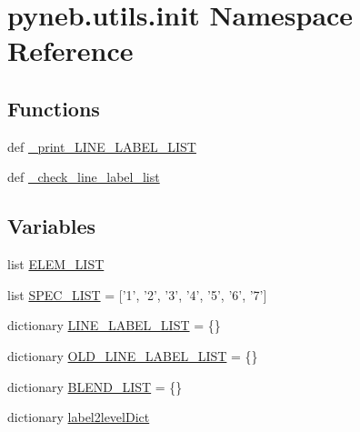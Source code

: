 \hypertarget{namespacepyneb_1_1utils_1_1init}{\section{pyneb.\-utils.\-init Namespace Reference}
\label{namespacepyneb_1_1utils_1_1init}
}
\subsection*{Functions}
\begin{DoxyCompactItemize}
\item 
def \hyperlink{namespacepyneb_1_1utils_1_1init_adeccc39c0a14a054bc294f2c3ddf9b1c}{\-\_\-print\-\_\-\-L\-I\-N\-E\-\_\-\-L\-A\-B\-E\-L\-\_\-\-L\-I\-S\-T}
\item 
def \hyperlink{namespacepyneb_1_1utils_1_1init_a1032ff20f913ca4a766e36da2140ee97}{\-\_\-check\-\_\-line\-\_\-label\-\_\-list}
\end{DoxyCompactItemize}
\subsection*{Variables}
\begin{DoxyCompactItemize}
\item 
list \hyperlink{namespacepyneb_1_1utils_1_1init_a3c09818249d1b1194ea51949b934e232}{E\-L\-E\-M\-\_\-\-L\-I\-S\-T}
\item 
list \hyperlink{namespacepyneb_1_1utils_1_1init_afd0ab6834d14e36c7ba2bfa6fdfbd386}{S\-P\-E\-C\-\_\-\-L\-I\-S\-T} = \mbox{[}'1', '2', '3', '4', '5', '6', '7'\mbox{]}
\item 
dictionary \hyperlink{namespacepyneb_1_1utils_1_1init_a2db1385e0dfb34bdc19ec2e7491041b3}{L\-I\-N\-E\-\_\-\-L\-A\-B\-E\-L\-\_\-\-L\-I\-S\-T} = \{\}
\item 
dictionary \hyperlink{namespacepyneb_1_1utils_1_1init_aae3ff006599d45be21cb0b2753f14802}{O\-L\-D\-\_\-\-L\-I\-N\-E\-\_\-\-L\-A\-B\-E\-L\-\_\-\-L\-I\-S\-T} = \{\}
\item 
dictionary \hyperlink{namespacepyneb_1_1utils_1_1init_a88fe95af75ee9a6faed10cc8a74bac2e}{B\-L\-E\-N\-D\-\_\-\-L\-I\-S\-T} = \{\}
\item 
dictionary \hyperlink{namespacepyneb_1_1utils_1_1init_a7dacd254fb434e414b2792c54049616c}{label2level\-Dict}
\end{DoxyCompactItemize}


